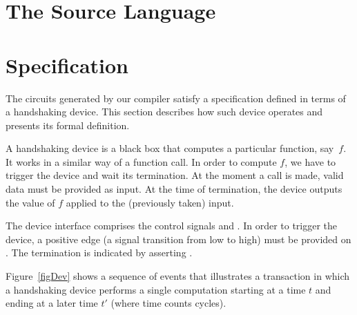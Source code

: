 \documentclass{llncs}
\begin{document}
\section{The Source Language}
\label{secTheSourceLanguage}


\section{Specification}
\label{secSpecification}
The circuits generated by our compiler satisfy
a specification defined in terms of a handshaking device.
This section describes how such device operates and 
presents its formal definition.

A handshaking device is a black box that 
computes a particular function, say~$f$. 
It works in a similar way of a function call.
In order to compute $f$, we have to trigger 
the device and wait its termination.
At the moment a call is made, valid data
must be provided as input. At the time of
termination, the device outputs the value
of $f$ applied to the (previously taken) input.

The device interface comprises
the control signals  and .
In order to trigger the device, a positive
edge (a signal transition from low to high)
must be provided on . The termination
is indicated by asserting .

Figure~\ref{figDev} shows a sequence of events that illustrates a
transaction in which a handshaking device performs a single
computation starting at a time $t$ and ending at a later time $t'$
(where time counts cycles). 
\end{document}
